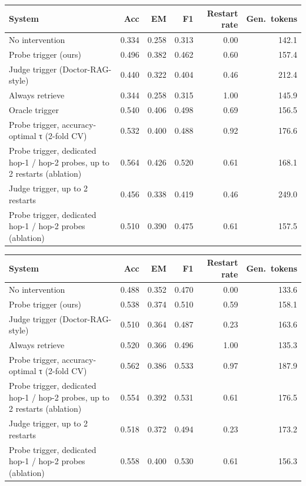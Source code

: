 \begin{tabular}{lrrrrr}
\toprule
System & Acc & EM & F1 & Restart rate & Gen.\ tokens \\
\midrule
No intervention & 0.334 & 0.258 & 0.313 & 0.00 & 142.1 \\
Probe trigger (ours) & 0.496 & 0.382 & 0.462 & 0.60 & 157.4 \\
Judge trigger (Doctor-RAG-style) & 0.440 & 0.322 & 0.404 & 0.46 & 212.4 \\
Always retrieve & 0.344 & 0.258 & 0.315 & 1.00 & 145.9 \\
Oracle trigger & 0.540 & 0.406 & 0.498 & 0.69 & 156.5 \\
Probe trigger, accuracy-optimal τ (2-fold CV) & 0.532 & 0.400 & 0.488 & 0.92 & 176.6 \\
Probe trigger, dedicated hop-1 / hop-2 probes, up to 2 restarts (ablation) & 0.564 & 0.426 & 0.520 & 0.61 & 168.1 \\
Judge trigger, up to 2 restarts & 0.456 & 0.338 & 0.419 & 0.46 & 249.0 \\
Probe trigger, dedicated hop-1 / hop-2 probes (ablation) & 0.510 & 0.390 & 0.475 & 0.61 & 157.5 \\
\bottomrule
\end{tabular}

\begin{tabular}{lrrrrr}
\toprule
System & Acc & EM & F1 & Restart rate & Gen.\ tokens \\
\midrule
No intervention & 0.488 & 0.352 & 0.470 & 0.00 & 133.6 \\
Probe trigger (ours) & 0.538 & 0.374 & 0.510 & 0.59 & 158.1 \\
Judge trigger (Doctor-RAG-style) & 0.510 & 0.364 & 0.487 & 0.23 & 163.6 \\
Always retrieve & 0.520 & 0.366 & 0.496 & 1.00 & 135.3 \\
Probe trigger, accuracy-optimal τ (2-fold CV) & 0.562 & 0.386 & 0.533 & 0.97 & 187.9 \\
Probe trigger, dedicated hop-1 / hop-2 probes, up to 2 restarts (ablation) & 0.554 & 0.392 & 0.531 & 0.61 & 176.5 \\
Judge trigger, up to 2 restarts & 0.518 & 0.372 & 0.494 & 0.23 & 173.2 \\
Probe trigger, dedicated hop-1 / hop-2 probes (ablation) & 0.558 & 0.400 & 0.530 & 0.61 & 156.3 \\
\bottomrule
\end{tabular}

